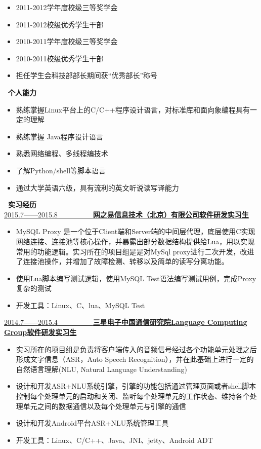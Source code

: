 \documentclass[UTF8, winfonts]{ctexart}
\begin{document}
\begin{itemize}
  \setlength{\itemsep}{0pt}
  \setlength{\parsep}{3pt}
  \setlength{\parskip}{3pt}
  \item {}2011-2012学年度校级三等奖学金
  \item {}2011-2012校级优秀学生干部
  \item {}2010-2011学年度校级三等奖学金
  \item {}2010-2011校级优秀学生干部
  \item {}担任学生会科技部部长期间获“优秀部长”称号
\end{itemize}
\noindent \textbf{ \heiti \faCogs\ 个人能力}
\begin{itemize}
  \setlength{\itemsep}{0pt}
  \setlength{\parsep}{3pt}
  \setlength{\parskip}{3pt}
  \item {}熟练掌握Linux平台上的C/C++程序设计语言，对标准库和面向象编程具有一定的理解
  \item {}熟练掌握 Java程序设计语言
  \item {}熟悉网络编程、多线程编技术
  \item {}了解Python/shell等脚本语言
  \item {}通过大学英语六级，具有流利的英文听说读写译能力
\end{itemize}
\noindent \textbf{ \heiti \faBriefcase\ 实习经历}\\
\uline{2015.7——2015.8~~~~~~~~~~\bf{网之易信息技术（北京）有限公司}\hfill \bf{软件研发实习生}}
\begin{itemize}
  \setlength{\itemsep}{0pt}
  \setlength{\parsep}{3pt}
  \setlength{\parskip}{3pt}
  \item {}MySQL Proxy 是一个位于Client端和Server端的中间层代理，底层使用C实现网络连接、连接池等核心操作，并暴露出部分数据结构提供给Lua，用以实现常用的功能逻辑。实习所在的项目组是是对MySql proxy进行二次开发，改进了连接池操作，并增加了故障检测、转移以及简单的读写分离功能。
  \item {}使用Lua脚本编写测试逻辑，使用MySQL Test语法编写测试用例，完成Proxy复杂的测试
  \item {}开发工具：Linux、C、lua、MySQL Test
\end{itemize}
\uline{2014.7——2015.4~~~~~~~~~~\bf{三星电子中国通信研究院Language Computing Group}\hfill \bf{软件研发实习生}}
\begin{itemize}
  \setlength{\itemsep}{0pt}
  \setlength{\parsep}{3pt}
  \setlength{\parskip}{3pt}
  \item {}实习所在的项目组是负责将客户端传入的音频信号经过各个功能单元处理之后形成文字信息（ASR，Auto Speech Recognition），并在此基础上进行一定的自然语言理解(NLU, Natural Language Understanding)
  \item {}设计和开发ASR+NLU系统引擎，引擎的功能包括通过管理页面或者shell脚本控制每个处理单元的启动和关闭、监听每个处理单元的工作状态、维持各个处理单元之间的数据通信以及每个处理单元与引擎的通信
  \item {}设计和开发Android平台ASR+NLU系统管理工具
  \item {}开发工具：Linux、C/C++、Java、JNI、jetty、Android ADT
\end{itemize}
\end{document}
